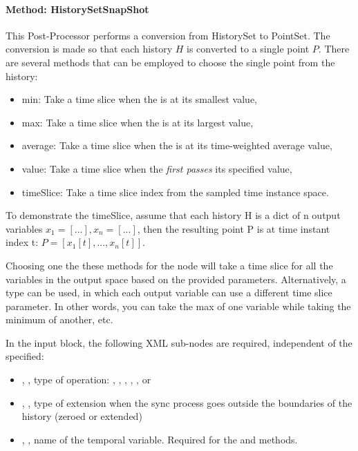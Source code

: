 \paragraph{Method: HistorySetSnapShot}
This Post-Processor performs a conversion from HistorySet to PointSet.
The conversion is made so that each history $H$ is converted to a single point $P$.
There are several methods that can be employed to choose the single point from the history:
\begin{itemize}
  \item min: Take a time slice when the  is at its smallest value,
  \item max: Take a time slice when the  is at its largest value,
  \item average: Take a time slice when the  is at its time-weighted average value,
  \item value: Take a time slice when the  \emph{first passes} its specified value,
  \item timeSlice: Take a time slice index from the sampled time instance space.
\end{itemize}
To demonstrate the timeSlice, assume that each history H is a dict of n output variables $x_1=[...],
x_n=[...]$, then the resulting point P is at time instant index t: $P=[x_1[t],...,x_n[t]]$.

Choosing one the these methods for the  node will take a time slice for all the variables in the
output space based on the provided parameters.  Alternatively, a  type can be used, in which
each output variable can use a different time slice parameter.  In other words, you can take the max of one
variable while taking the minimum of another, etc.

In the  input block, the following XML sub-nodes are required,
independent of the  specified:

\begin{itemize}
  \item {}, , type of operation: , ,
                        , , , or 
   \item {}, , type of extension when the sync process goes outside the boundaries of the history (zeroed or extended)
   \item {}, , name of the temporal variable.  Required for the
      and  methods.
\end{itemize}

